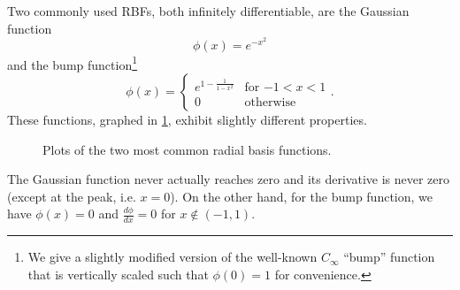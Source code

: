 Two commonly used RBFs, both infinitely differentiable, are the Gaussian function
\begin{equation}
    \label{eq:gaussian}
    \phi(x) = e^{-x^2}
\end{equation}
and the bump function\footnote{We give a slightly modified version of the well-known $C_\infty$ ``bump'' function \cite{johnson2015} that is vertically scaled such that $\phi(0)=1$ for convenience.}
\begin{equation}
    \label{eq:bump}
    \phi(x) = 
    \begin{cases}
        e^{1-\frac{1}{1-x^2}} & \text{for $-1<x<1$} \\
        0 & \text{otherwise}
    \end{cases}.
\end{equation}
These functions, graphed in \ref{fig:rbfs}, exhibit slightly different properties.
\begin{figure}
    \centering
    \caption{Plots of the two most common radial basis functions.}
    \label{fig:rbfs}
\end{figure}
The Gaussian function never actually reaches zero and its derivative is never zero (except at the peak, i.e. $x=0$). 
On the other hand, for the bump function, we have $\phi(x)=0$ and $\frac{d\phi}{dx}=0$ for $x \notin (-1, 1)$.

